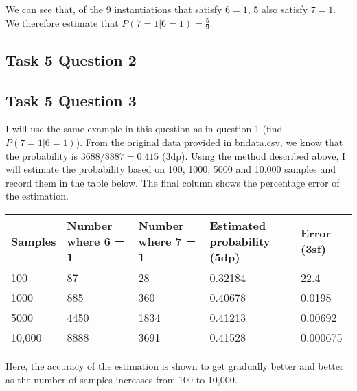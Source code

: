 \documentclass[a4paper,11pt]{article}
\begin{document}
We can see that, of the 9 instantiations that satisfy $6=1$, 5 also satisfy $7=1$.  We therefore estimate that $P(7=1|6=1) = \frac{5}{9}$.

\subsection{Task 5 Question 2}


\subsection{Task 5 Question 3}

I will use the same example in this question as in question 1 (find $P(7=1|6=1)$).  From the original data provided in bndata.csv, we know that the probability is $3688 / 8887 = 0.415$ (3dp).  Using the method described above, I will estimate the probability based on 100, 1000, 5000 and 10,000 samples and record them in the table below.  The final column shows the percentage error of the estimation.

\begin{tabular}{l l l l l}
	Samples		& Number where 6 = 1	& Number where 7 = 1	& Estimated probability (5dp)		& Error (3sf) \\
	\hline
	100		& 87	& 28	& 0.32184		& 22.4 \\
	1000	& 885	& 360	& 0.40678		& 0.0198 \\
	5000	& 4450	& 1834	& 0.41213		& 0.00692 \\
	10,000	& 8888	& 3691	& 0.41528		& 0.000675
\end{tabular}

Here, the accuracy of the estimation is shown to get gradually better and better as the number of samples increases from 100 to 10,000.
\end{document}
